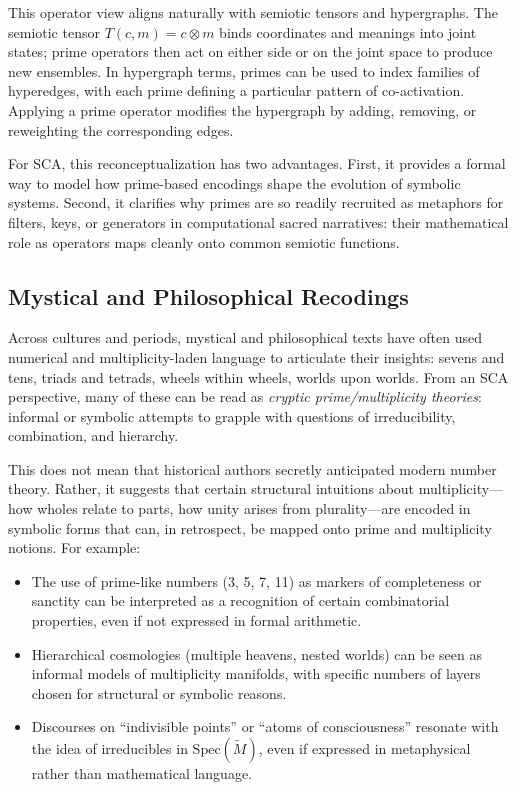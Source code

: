 \documentclass[12]{amsart}
\theoremstyle{plain}
\begin{document}
This operator view aligns naturally with semiotic tensors and hypergraphs. The semiotic tensor $T(c,m) = c \otimes m$ binds coordinates and meanings into joint states; prime operators then act on either side or on the joint space to produce new ensembles. In hypergraph terms, primes can be used to index families of hyperedges, with each prime defining a particular pattern of co-activation. Applying a prime operator modifies the hypergraph by adding, removing, or reweighting the corresponding edges.

For SCA, this reconceptualization has two advantages. First, it provides a formal way to model how prime-based encodings shape the evolution of symbolic systems. Second, it clarifies why primes are so readily recruited as metaphors for filters, keys, or generators in computational sacred narratives: their mathematical role as operators maps cleanly onto common semiotic functions.

\subsection{Mystical and Philosophical Recodings}

Across cultures and periods, mystical and philosophical texts have often used numerical and multiplicity-laden language to articulate their insights: sevens and tens, triads and tetrads, wheels within wheels, worlds upon worlds. From an SCA perspective, many of these can be read as \emph{cryptic prime/multiplicity theories}: informal or symbolic attempts to grapple with questions of irreducibility, combination, and hierarchy.

This does not mean that historical authors secretly anticipated modern number theory. Rather, it suggests that certain structural intuitions about multiplicity—how wholes relate to parts, how unity arises from plurality—are encoded in symbolic forms that can, in retrospect, be mapped onto prime and multiplicity notions. For example:

\begin{itemize}
  \item The use of prime-like numbers (3, 5, 7, 11) as markers of completeness or sanctity can be interpreted as a recognition of certain combinatorial properties, even if not expressed in formal arithmetic.
  \item Hierarchical cosmologies (multiple heavens, nested worlds) can be seen as informal models of multiplicity manifolds, with specific numbers of layers chosen for structural or symbolic reasons.
  \item Discourses on ``indivisible points'' or ``atoms of consciousness'' resonate with the idea of irreducibles in $\mathrm{Spec}(\tilde M)$, even if expressed in metaphysical rather than mathematical language.
\end{itemize}
\end{document}
